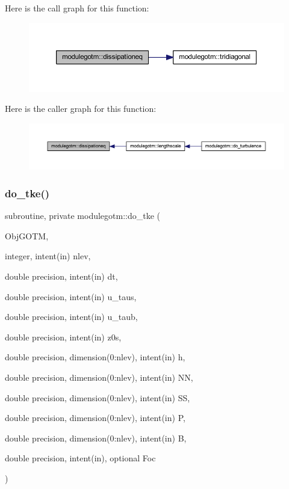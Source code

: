Here is the call graph for this function\+:\nopagebreak
\begin{figure}[H]
\begin{center}
\leavevmode
\includegraphics[width=350pt]{namespacemodulegotm_ac05dd8d50f9ddc2c286122142f8a400e_cgraph}
\end{center}
\end{figure}
Here is the caller graph for this function\+:\nopagebreak
\begin{figure}[H]
\begin{center}
\leavevmode
\includegraphics[width=350pt]{namespacemodulegotm_ac05dd8d50f9ddc2c286122142f8a400e_icgraph}
\end{center}
\end{figure}
\mbox{\label{namespacemodulegotm_ae39109acd910c29deba62e83a6edce50}} 
\subsubsection{\texorpdfstring{do\+\_\+tke()}{do\_tke()}}
{\footnotesize\ttfamily subroutine, private modulegotm\+::do\+\_\+tke (\begin{DoxyParamCaption}\item[{}]{Obj\+G\+O\+TM,  }\item[{integer, intent(in)}]{nlev,  }\item[{double precision, intent(in)}]{dt,  }\item[{double precision, intent(in)}]{u\+\_\+taus,  }\item[{double precision, intent(in)}]{u\+\_\+taub,  }\item[{double precision, intent(in)}]{z0s,  }\item[{double precision, dimension(0\+:nlev), intent(in)}]{h,  }\item[{double precision, dimension(0\+:nlev), intent(in)}]{NN,  }\item[{double precision, dimension(0\+:nlev), intent(in)}]{SS,  }\item[{double precision, dimension(0\+:nlev), intent(in)}]{P,  }\item[{double precision, dimension(0\+:nlev), intent(in)}]{B,  }\item[{double precision, intent(in), optional}]{Foc }\end{DoxyParamCaption})\hspace{0.3cm}{\ttfamily [private]}}

